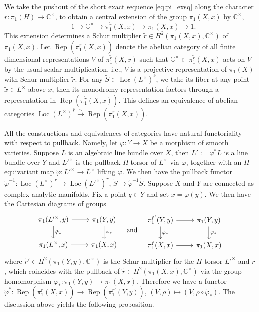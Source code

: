 \documentclass[12pt]{amsart}
\newcommand{\C}{\mathbb{C}}
\newcommand{\cm}{\C^\times}
\newcommand{\wt}{\widetilde}
\newcommand{\loc}{\operatorname{Loc}}
\theoremstyle{definition}
\numberwithin{equation}{section}
\begin{document}
We take the pushout of the short exact sequence \eqref{eq:pi_exsq} along the character $\bar{r}: \pi_1(H) \to \cm$, to obtain a central extension of the group $\pi_1(X,x)$ by $\cm$,
\[  \quad 1 \to \cm \to \pi^{\tilde{r}}_1(X, x) \to \pi_1(X, x) \to 1.  \]
This extension determines a Schur multiplier $\tilde{r} \in H^2(\pi_1(X, x), \cm)$ of $\pi_1(X, x)$. Let $\operatorname{Rep}(\pi^{\tilde{r}}_1(X, x))$ denote the abelian category of all finite dimensional representations $V$ of $\pi^{\tilde{r}}_1(X, x)$ such that $\cm \subset \pi^{\tilde{r}}_1(X, x)$ acts on $V$ by the usual scalar multiplication, i.e., $V$ is a projective representation of $\pi_1(X)$ with Schur multiplier $\tilde{r}$. For any $\wt{S} \in \loc(L^\times)^{\bar{r}}$, we take its fiber at any point $\tilde{x} \in L^\times$ above $x$, then its monodromy representation factors through a representation in $\operatorname{Rep}(\pi^{\tilde{r}}_1(X, x))$. This defines an equivalence of abelian categories $\loc(L^\times)^{\bar{r}} \xrightarrow{\sim} \operatorname{Rep}(\pi^{\tilde{r}}_1(X, x))$.

All the constructions and equivalences of categories have natural functoriality with respect to pullback. Namely, let $\varphi: Y \to X$ be a morphism of smooth varieties. Suppose $L$ is an algebraic line bundle over $X$, then $L':=\varphi^* L$ is a line bundle over $Y$ and $L'^\times$ is the pullback $H$-torsor of $L^\times$ via $\varphi$, together with an $H$-equivariant map $\tilde{\varphi}: L'^\times \to L^\times$ lifting $\varphi$. We then have the pullback functor $\tilde{\varphi}^{-1}: \operatorname{Loc}(L^\times)^{\bar{r}} \to \operatorname{Loc}(L'^\times)^{\bar{r}}$, $\wt{S} \mapsto \tilde{\varphi}^{-1} \wt{S}$. Suppose $X$ and $Y$ are connected as complex
analytic manifolds. Fix a point $y \in Y$ and set $x = \varphi(y)$. We then have the Cartesian diagrams of groups
\begin{equation}\label{diag:pi_groups}
	\begin{tikzcd}
		\pi_1(L'^\times, y) \arrow{r} \arrow[d, "\tilde{\varphi}_*"]  & \pi_1(Y,y)  \arrow[d, "\varphi_*"]   \\
		\pi_1(L^\times, x) \arrow{r}  & \pi_1(X, x)
	\end{tikzcd}	
	\quad \text{and} \quad
	\begin{tikzcd}
		\pi^{\tilde{r}'}_1(Y, y) \arrow{r} \arrow[d, "\tilde{\varphi}_*"]  & \pi_1(Y,y)  \arrow[d, "\varphi_*"]   \\
		\pi^{\tilde{r}}_1(X, x) \arrow{r}  & \pi_1(X, x)
	\end{tikzcd}
\end{equation}
where $\tilde{r}' \in H^2(\pi_1(Y,y), \cm)$ is the Schur multiplier for the $H$-torsor $L'^\times$ and $r$, which coincides with the pullback of $\tilde{r} \in H^2(\pi_1(X,x), \cm)$ via the group homomorphism $\varphi_*: \pi_1(Y,y) \to \pi_1(X,x)$. Therefore we have a functor $\tilde{\varphi}^*: \operatorname{Rep}(\pi^{\tilde{r}}_1(X, x)) \to \operatorname{Rep}(\pi^{\tilde{r}'}_1(Y, y))$, $(V, \rho) \mapsto (V, \rho \circ  \tilde{\varphi}_*)$. The discussion above yields the following proposition.
\end{document}
